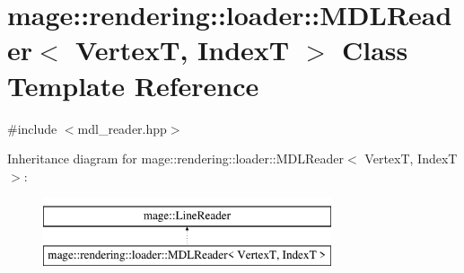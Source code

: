 \hypertarget{classmage_1_1rendering_1_1loader_1_1_m_d_l_reader}{}\section{mage\+:\+:rendering\+:\+:loader\+:\+:M\+D\+L\+Reader$<$ VertexT, IndexT $>$ Class Template Reference}
\label{classmage_1_1rendering_1_1loader_1_1_m_d_l_reader}


{\ttfamily \#include $<$mdl\+\_\+reader.\+hpp$>$}

Inheritance diagram for mage\+:\+:rendering\+:\+:loader\+:\+:M\+D\+L\+Reader$<$ VertexT, IndexT $>$\+:\begin{figure}[H]
\begin{center}
\leavevmode
\includegraphics[height=2.000000cm]{classmage_1_1rendering_1_1loader_1_1_m_d_l_reader}
\end{center}
\end{figure}
